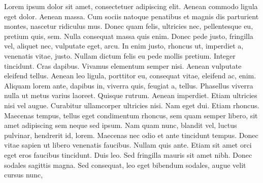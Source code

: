 \begin{question}

  Lorem ipsum dolor sit amet, consectetuer adipiscing 
  elit. Aenean commodo ligula eget dolor. Aenean massa.
  Cum sociis natoque penatibus et magnis dis parturient
  montes, nascetur ridiculus mus. Donec quam felis, 
  ultricies nec, pellentesque eu, pretium quis, sem. 
  Nulla consequat massa quis enim. Donec pede justo, 
  fringilla vel, aliquet nec, vulputate eget, arcu. In 
  enim justo, rhoncus ut, imperdiet a, venenatis vitae,
  justo. Nullam dictum felis eu pede mollis pretium. 
  Integer tincidunt. Cras dapibus. Vivamus elementum 
  semper nisi. Aenean vulputate eleifend tellus. Aenean 
  leo ligula, porttitor eu, consequat vitae, eleifend 
  ac, enim. Aliquam lorem ante, dapibus in, viverra 
  quis, feugiat a, tellus. Phasellus viverra nulla ut 
  metus varius laoreet. Quisque rutrum. Aenean imperdiet.
  Etiam ultricies nisi vel augue. Curabitur ullamcorper 
  ultricies nisi. Nam eget dui. Etiam rhoncus. Maecenas 
  tempus, tellus eget condimentum rhoncus, sem quam 
  semper libero, sit amet adipiscing sem neque sed ipsum. Nam quam nunc, blandit vel, luctus pulvinar, hendrerit id, lorem. Maecenas nec odio et ante tincidunt tempus. Donec vitae sapien ut libero venenatis faucibus. Nullam quis ante. Etiam sit amet orci eget eros faucibus tincidunt. Duis leo. Sed fringilla mauris sit amet nibh. Donec sodales sagittis magna. Sed consequat, leo eget bibendum sodales, augue velit cursus nunc, 
\end{question}
